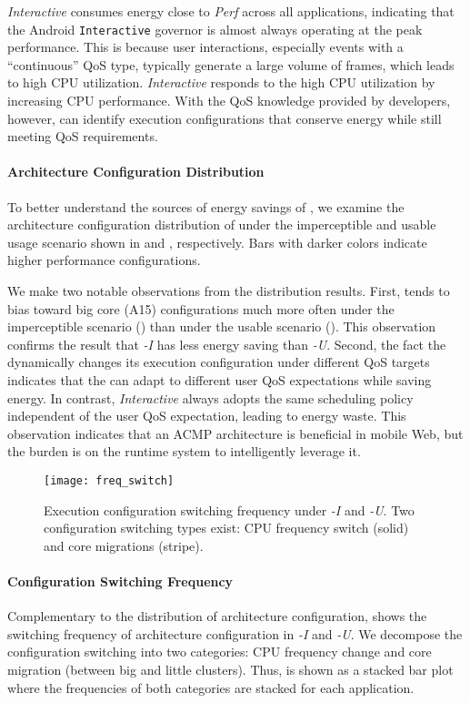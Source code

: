 \textit{Interactive} consumes energy close to \textit{Perf} across all applications, indicating that the Android \texttt{Interactive} governor is almost always operating at the peak performance. This is because user interactions, especially events with a ``continuous'' QoS type, typically generate a large volume of frames, which leads to high CPU utilization. \textit{Interactive} responds to the high CPU utilization by increasing CPU performance. With the QoS knowledge provided by developers, however, \ebs can identify execution configurations that conserve energy while still meeting QoS requirements.

\paragraph{Architecture Configuration Distribution} To better understand the sources of energy savings of \ebs , we examine the architecture configuration distribution of \ebs under the imperceptible and usable usage scenario shown in  and , respectively. Bars with darker colors indicate higher performance configurations.

We make two notable observations from the distribution results. First, \ebs tends to bias toward big core (A15) configurations much more often under the imperceptible scenario () than under the usable scenario (). This observation confirms the result that \textit{\ebs-I} has less energy saving than \textit{\ebs-U}. Second, the fact the \ebs dynamically changes its execution configuration under different QoS targets indicates that the \ebs can adapt to different user QoS expectations while saving energy. In contrast, \textit{Interactive} always adopts the same scheduling policy independent of the user QoS expectation, leading to energy waste. This observation indicates that an ACMP architecture is beneficial in mobile Web, but the burden is on the runtime system to intelligently leverage it.

\begin{figure}[t]
  \centering
  \texttt{[image: freq\_switch]}
  \caption{Execution configuration switching frequency under \textit{\ebs-I} and \textit{\ebs-U}. Two configuration switching types exist: CPU frequency switch (solid) and core migrations (stripe).}
  \label{fig:freq_switch}
\end{figure}

\paragraph{Configuration Switching Frequency} Complementary to the distribution of architecture configuration,  shows the switching frequency of architecture configuration in \textit{\ebs-I} and \textit{\ebs-U}. We decompose the configuration switching into two categories: CPU frequency change and core migration (between big and little clusters). Thus,  is shown as a stacked bar plot where the frequencies of both categories are stacked for each application.

